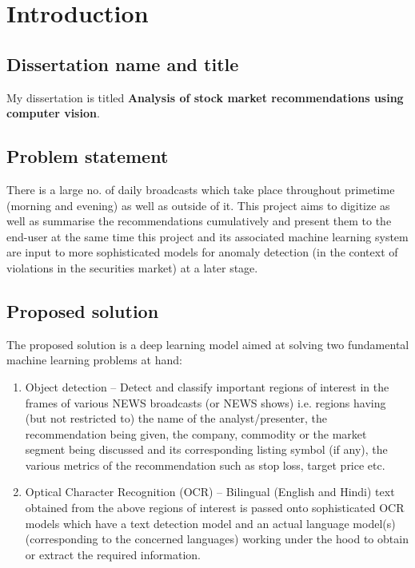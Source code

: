 \chapter{Introduction} \label{chapter1}

\thispagestyle{empty} %

\setcounter{page}{2} %

\section{Dissertation name and title}
My dissertation is titled \textbf{Analysis of stock market
recommendations using computer vision}.

\section{Problem statement}
There is a large no. of daily broadcasts which take place throughout
primetime (morning and evening) as well as outside of it. This
project aims to digitize as well as summarise the recommendations
cumulatively and present them to the end-user at the same time this
project and its associated machine learning system are input to more
sophisticated models for anomaly detection (in the context of
violations in the securities market) at a later stage.

\section{Proposed solution}
The proposed solution is a deep learning model aimed at solving two
fundamental machine learning problems at hand:

\begin{enumerate}
  \item Object detection – Detect and classify important regions of
    interest in the frames of various NEWS broadcasts (or NEWS shows)
    i.e. regions having (but not restricted to) the name of the
    analyst/presenter, the recommendation being given, the company,
    commodity or the market segment being discussed and its
    corresponding listing symbol (if any), the various metrics of the
    recommendation such as stop loss, target price etc.

  \item  Optical Character Recognition (OCR) – Bilingual (English and
    Hindi) text obtained from the above regions of interest is passed
    onto sophisticated OCR models which have a text detection model
    and an actual language model(s) (corresponding to the concerned
    languages) working under the hood to obtain or extract the
    required information.

\end{enumerate}

